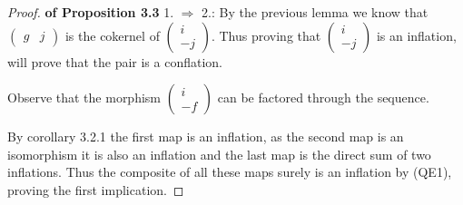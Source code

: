 \documentclass[11pt]{article}
\theoremstyle{definition}
\theoremstyle{remark}
\begin{document}
            \begin{proof}
                \textbf{of Proposition 3.3} 1. $\Rightarrow$ 2.: By the previous lemma we know that $\begin{pmatrix}
                    g & j
                \end{pmatrix}$ is the cokernel of $\begin{pmatrix}
                    i \\ -j
                \end{pmatrix}$. Thus proving that $\begin{pmatrix}
                    i \\ -j
                \end{pmatrix}$ is an inflation, will prove that the pair is a conflation. 
                
                Observe that the morphism $\begin{pmatrix}
                    i \\ -f
                \end{pmatrix}$ can be factored through the sequence. 
                \begin{center}
                \end{center}
                By corollary 3.2.1 the first map is an inflation, as the second map is an isomorphism it is also an inflation and the last map is the direct sum of two inflations. Thus the composite of all these maps surely is an inflation by (QE1), proving the first implication.


\end{proof}
\end{document}
